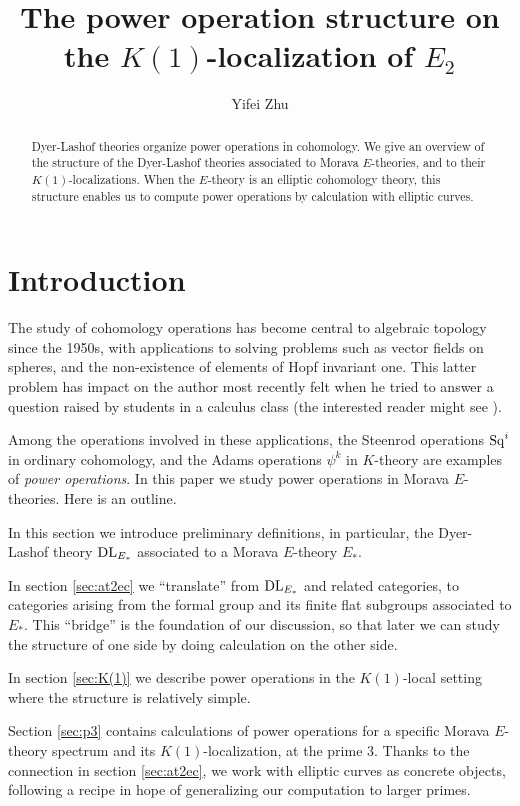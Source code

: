 \documentclass{gtpart}
\title{The power operation structure on the $K(1)$-localization of $E_2$}
\author{Yifei Zhu}
\theoremstyle{definition}
\theoremstyle{remark}
\newcommand{\DL}{{\rm DL}}
\begin{document}
\begin{abstract}
 Dyer-Lashof theories organize power operations in cohomology.  We give an overview of the structure of the Dyer-Lashof theories 
 associated to Morava $E$-theories, and to their $K(1)$-localizations.  
 When the $E$-theory is an elliptic cohomology theory, this structure enables us to compute power operations by calculation with 
 elliptic curves.  
\end{abstract}

\maketitle
\section{Introduction}
\label{sec:intro}


The study of cohomology operations has become central to algebraic 
topology since the 1950s, with applications to solving problems such as 
vector fields on spheres, and the non-existence of elements of Hopf 
invariant one.  This latter problem has impact on the author most 
recently felt when he tried to answer a question raised by students in a 
calculus class (the interested reader might see \cite[theorem II]{massey}).  

Among the operations involved in these applications, the Steenrod operations ${\rm Sq}^i$ in ordinary cohomology, 
and the Adams operations $\psi^k$ in $K$-theory are examples of {\em power operations}.  
In this paper we study power operations in Morava $E$-theories.  Here is 
an outline.  

In this section we introduce preliminary definitions, in 
particular, the Dyer-Lashof theory $\DL_{E_*}$ associated to a Morava 
$E$-theory $E_*$.  

In section \ref{sec:at2ec} we ``translate'' from $\DL_{E_*}$ and related 
categories, to categories arising from the formal group and its finite flat subgroups 
associated to $E_*$.  This ``bridge'' is the foundation 
of our discussion, so that later we can study the structure of one side by doing calculation on the other side.  

In section \ref{sec:K(1)} we describe power operations in the $K(1)$-local setting where the structure is relatively simple.  

Section \ref{sec:p3} contains calculations of power 
operations for a specific Morava $E$-theory spectrum and its 
$K(1)$-localization, at the prime 3.  Thanks to the connection in section \ref{sec:at2ec}, we work with elliptic curves as concrete objects, following a recipe in hope of 
generalizing our computation to larger primes.  
\end{document}
